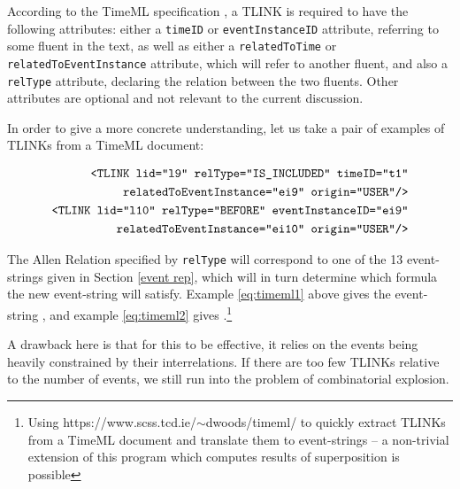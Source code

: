 \documentclass[a4paper,11pt,leqno]{article}
\newcommand{\vph}[1]{\vphantom{#1}}
\newcommand{\ebox}[1]{\fbox{$\vph{',}#1$}}
\begin{document}
According to the TimeML specification \citep{timeml2005timeml}, a TLINK is 
required to have the following attributes: either a \texttt{timeID} or 
\texttt{eventInstanceID} attribute, referring to some fluent in the text, as 
well as either a \texttt{relatedToTime} or \texttt{relatedToEventInstance} 
attribute, which will refer to another fluent, and also a \texttt{relType} 
attribute, declaring the relation between the two fluents. Other attributes are 
optional and not relevant to the current discussion.

In order to give a more concrete understanding, let us take a pair of examples 
of TLINKs from a TimeML document: 

\begin{align}
\mbox{\texttt{<TLINK lid="l9" relType="IS\_INCLUDED" timeID="t1"}}\\ 
\label{eq:timeml1}
\mbox{\texttt{relatedToEventInstance="ei9" origin="USER"/>}} \notag\\
\mbox{\texttt{<TLINK lid="l10" relType="BEFORE" 
eventInstanceID="ei9"}}\\\label{eq:timeml2}
\mbox{\texttt{relatedToEventInstance="ei10" origin="USER"/>}} \notag
\end{align}

\noindent
The Allen Relation specified by \texttt{relType} will correspond to 
one of the 13 event-strings given in Section \ref{event rep}, which will 
in 
turn determine which formula the new event-string will satisfy. Example 
\ref{eq:timeml1} above gives the event-string \ebox{}\ebox{ei9}\ebox{t1, 
ei9}\ebox{t1}\ebox{}, and example \ref{eq:timeml2} gives 
\ebox{}\ebox{ei9}\ebox{}\ebox{ei10}\ebox{}.\footnote{Using 
	https://www.scss.tcd.ie/$\sim$dwoods/timeml/ to quickly extract TLINKs from 
	a 
	TimeML document and translate them to event-strings -- a non-trivial 
	extension of this program which computes results of superposition is 
	possible}

A drawback here is that for this to be effective, it relies on the events being 
heavily constrained by their interrelations. If there are too few TLINKs 
relative to the number of events, we still run into the problem of 
combinatorial explosion.
\end{document}
